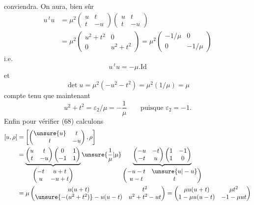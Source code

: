 conviendra. On aura, bien sûr
\[
\begin{aligned}
u\,{}^tu
&=\mu^2\begin{pmatrix}u&t\\t&-u\end{pmatrix}
\begin{pmatrix}u&t\\t&-u\end{pmatrix}\\
&=\mu^2\begin{pmatrix}u^2+t^2&0\\0&u^2+t^2\end{pmatrix}
=\mu^2\begin{pmatrix}-1/\mu&0\\0&-1/\mu\end{pmatrix}
\end{aligned}
\]
i.e.
\[
u\,{}^tu=-\mu.\mathrm{Id}
\]
et
\[
\det u=\mu^2(-u^2-t^2)=\mu^2(1/\mu)=\mu
\]
compte tenu que maintenant
\[
u^2+t^2=\varepsilon_2/\mu=-\frac1\mu
\qquad\text{puisque }\varepsilon_2=-1.
\]
Enfin pour vérifier (68) calculons
\[
\begin{aligned}
[u,\rho]
&=\left[\begin{pmatrix}\unsure{u}&t\\t&-u\end{pmatrix},\rho\right]\\
&=\underbrace{
\begin{pmatrix}u&t\\t&-u\end{pmatrix}
\begin{pmatrix}0&1\\-1&1\end{pmatrix}
}_{\begin{pmatrix}-t&u+t\\u&-u+t\end{pmatrix}}
\unsure{\dfrac1\mu|\mu}
\underbrace{
\begin{pmatrix}-u&-t\\-t&u\end{pmatrix}
\begin{pmatrix}1&-1\\1&0\end{pmatrix}
}_{\begin{pmatrix}-u-t&\unsure{u|-u}\\u-t&t\end{pmatrix}}
\\
&=\mu\begin{pmatrix}
u(u+t)&t^2\\
\unsure{-(u^2+t^2)}-u(u-t)&u^2+t^2-ut
\end{pmatrix}
=\begin{pmatrix}
\mu u(u+t)&\mu t^2\\
1-\mu u(u-t)&-1-\mu ut
\end{pmatrix}
\end{aligned}
\]
